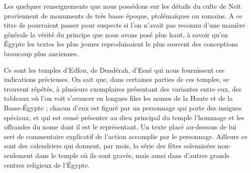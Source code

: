 \documentclass[letterpaper,twocolumn,openany,nodeprecatedcode]{dndbook}
\begin{document}
Les quelques renseignements que nous possédons sur les détails du culte de Neit proviennent de monuments de très basse époque, ptolémaïques ou romains. A ce titre ils pourraient passer pour suspects si l'on n'avait pas reconnu d'une manière générale la vérité du principe que nous avons posé plus haut, à savoir qu'en Égypte les textes les plus jeunes reproduisaient le plus souvent des conceptions beaucoup plus anciennes.

Ce sont les temples d'Edfou, de Dendérah, d'Esné qui nous fournissent ces indications précieuses. On sait que, dans certaines parties de ces temples, se trouvent répétés, à plusieurs exemplaires présentant des variantes entre eux, des tableaux où l'on voit s'avancer en longues files les nomes de la Haute et de la Basse-Égypte ; chacun d'eux est figuré par un personnage qui porte des insignes spéciaux, et qui est censé présenter au dieu principal du temple l'hommage et les offrandes du nome dont il est le représentant. Un texte placé au-dessous de lui sert de commentaire explicatif de l'action accomplie par le personnage. Ailleurs ce sont des calendriers qui donnent, par mois, la série des fêtes solennisées non-seulement dans le temple où ils sont gravés, mais aussi dans d'autres grands centres religieux de l'Égypte.
\end{document}
